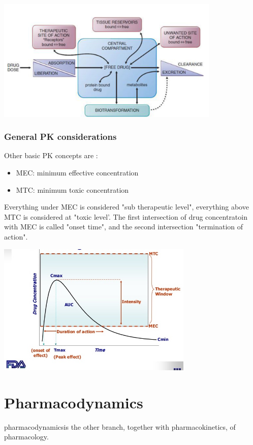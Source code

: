 \documentclass{book}
\begin{document}
\includegraphics[width=0.8\textwidth, center]{images/image10.png}

\subsection{General PK considerations}
Other basic PK concepts are :
\begin{itemize}
    \item MEC: minimum effective concentration
    \item MTC: minimum toxic concentration
\end{itemize}

Everything under MEC is considered "sub therapeutic level", everything above MTC is considered at "toxic level'.
The first intersection of drug concentratoin with MEC is called "onset time", and the second intersection "termination of action".

\includegraphics[width=0.7\textwidth, center]{images/image11.png}


\chapter{Pharmacodynamics}


pharmacodynamicsis the other branch, together with pharmacokinetics, of pharmacology.
\end{document}
